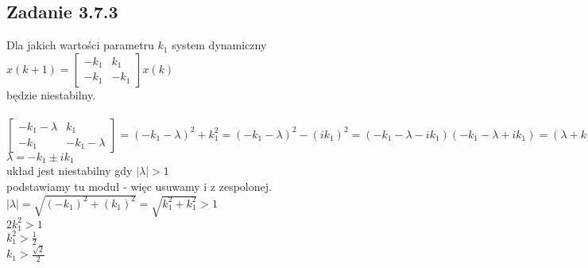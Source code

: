 \pagebreak
\subsection*{Zadanie 3.7.3} {\color{darkgray}
	Dla jakich wartości parametru $k_1$ system dynamiczny\\
	$x(k+1)=\left[ \begin{array}{cc}    -k_1 &k_1 \\ -k_1 &-k_1    \end{array}\right]x(k)$\\
	będzie niestabilny.
}\\\\
$\left[ \begin{array}{cc}    -k_1 -\lambda&k_1 \\ -k_1 &-k_1-\lambda    \end{array}\right]
=(-k_1-\lambda)^2+k_1^2=(-k_1-\lambda)^2-(ik_1)^2=(-k_1-\lambda-ik_1)(-k_1-\lambda+ik_1)=(\lambda+k_1-ik_1)(\lambda+k_1+ik_1)=0$\\
$\lambda=-k_1 \pm ik_1$\\
układ jest niestabilny gdy $|\lambda|>1$\\
podstawiamy tu moduł - więc usuwamy i z zespolonej.\\
$|\lambda|=\sqrt{(-k_1)^2+(k_1)^2}=\sqrt{k_1^2+k_1^2}>1$\\
$2k_1^2>1$\\
$k_1^2>\frac{1}{2}$\\
$k_1>\frac{\sqrt{2}}{2}$\\













\pagebreak

